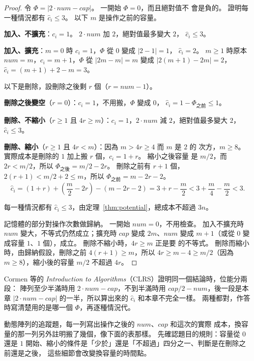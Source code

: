 \begin{proof}
令 $\Phi = |2 \cdot \mathit{num} - \mathit{cap}|$。 一開始 $\Phi = 0$，而且絕對值不
會是負的。 證明每一種情況都有 $\hat{c}_i \le 3$。 以下 $m$ 是操作之前的容量。

\textbf{加入、不擴充}：$c_i = 1$。 $2 \cdot \mathit{num}$ 加 $2$，絕對值最多變大 $2$，
$\hat{c}_i \le 3$。

\textbf{加入、擴充}：$m = 0$ 時 $c_i = 1$，$\Phi$ 從 $0$ 變成 $|2 - 1| = 1$，
$\hat{c}_i = 2$。 $m \ge 1$ 時原本 $\mathit{num} = m$，$c_i = m + 1$，$\Phi$ 從
$|2m - m| = m$ 變成 $|2(m + 1) - 2m| = 2$，$\hat{c}_i = (m + 1) + 2 - m = 3$。

以下是刪除，設刪除之後剩 $r$ 個（$r = \mathit{num} - 1$）。

\textbf{刪除之後變空}（$r = 0$）：$c_i = 1$，不用搬，$\Phi$ 變成 $0$，
$\hat{c}_i = 1 - \Phi_{\text{之前}} \le 1$。

\textbf{刪除、不縮小}（$r \ge 1$ 且 $4r \ge m$）：$c_i = 1$，$2 \cdot \mathit{num}$
減 $2$，絕對值最多變大 $2$，$\hat{c}_i \le 3$。

\textbf{刪除、縮小}（$r \ge 1$ 且 $4r < m$）：因為 $m > 4r \ge 4$ 而 $m$ 是 $2$ 的
次方，$m \ge 8$。 實際成本是刪除的 $1$ 加上搬 $r$ 個，$c_i = 1 + r$。 縮小之後容量
是 $m/2$，而 $2r < m/2$，所以 $\Phi_{\text{之後}} = m/2 - 2r$。 刪除之前有 $r + 1$
個，$2(r + 1) < m/2 + 2 \le m$，所以 $\Phi_{\text{之前}} = m - 2r - 2$。
\[
\hat{c}_i = (1 + r) + \left(\frac{m}{2} - 2r\right) - (m - 2r - 2)
= 3 + r - \frac{m}{2} < 3 + \frac{m}{4} - \frac{m}{2} < 3.
\]

每一種情況都有 $\hat{c}_i \le 3$，由定理~\ref{thm:potential}，總成本不超過 $3n$。

記憶體的部分對操作次數做歸納。 一開始 $\mathit{num} = 0$，不用檢查。 加入不擴充時
$\mathit{num}$ 變大，不等式仍然成立；擴充時 $\mathit{cap}$ 變成 $2m$、$\mathit{num}$
變成 $m + 1$（或從 $0$ 變成容量 $1$、$1$ 個），成立。 刪除不縮小時，$4r \ge m$ 正是要
的不等式。 刪除而縮小時，由歸納假設，刪除之前 $4(r + 1) \ge m$，所以 $4r \ge m - 4
\ge m/2$（因為 $m \ge 8$），縮小後的容量 $m/2$ 不超過 $4r$。
\end{proof}

\begin{examnote}
Cormen 等的 \textit{Introduction to Algorithms}（CLRS）證明同一個結論時，位能分兩段：
陣列至少半滿時用 $2 \cdot \mathit{num} - \mathit{cap}$，不到半滿時用
$\mathit{cap}/2 - \mathit{num}$，後一段是本章 $|2 \cdot \mathit{num} - \mathit{cap}|$
的一半，所以算出來的 $\hat{c}_i$ 和本章不完全一樣。 兩種都對，作答時寫清楚用的是哪一個
$\Phi$，再逐種情況代。

動態陣列的追蹤題，每一列寫出操作之後的 $\mathit{num}$、$\mathit{cap}$ 和這次的實際
成本，換容量的那一列另外註明搬了幾個，像下面的表那樣。 先確認題目的規則：容量從 $0$
還是 $1$ 開始、縮小的條件是「少於」還是「不超過」四分之一、判斷是在刪除之前還是之後，
這些細節會改變換容量的時間點。
\end{examnote}

